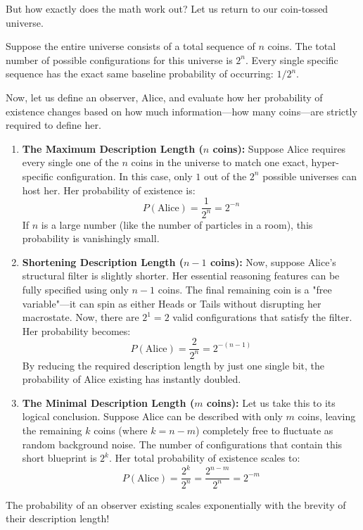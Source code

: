 But how exactly does the math work out? Let us return to our coin-tossed universe.

Suppose the entire universe consists of a total sequence of $n$ coins.
The total number of possible configurations for this universe is $2^n$.
Every single specific sequence has the exact same baseline probability of occurring: $1/2^n$. 

Now, let us define an observer, Alice, and evaluate how her probability of existence changes based on how much information—how many coins—are strictly required to define her.

\begin{enumerate}
    \item \textbf{The Maximum Description Length ($n$ coins):} Suppose Alice requires every single one of the $n$ coins in the universe to match one exact, hyper-specific configuration. In this case, only $1$ out of the $2^n$ possible universes can host her. Her probability of existence is:
    $$P(\text{Alice}) = \frac{1}{2^n} = 2^{-n}$$
    If $n$ is a large number (like the number of particles in a room), this probability is vanishingly small.
    
    \item \textbf{Shortening Description Length ($n-1$ coins):} Now, suppose Alice's structural filter is slightly shorter. Her essential reasoning features can be fully specified using only $n-1$ coins. The final remaining coin is a "free variable"—it can spin as either Heads or Tails without disrupting her macrostate. Now, there are $2^1 = 2$ valid configurations that satisfy the filter. Her probability becomes:
    $$P(\text{Alice}) = \frac{2}{2^n} = 2^{-(n-1)}$$
    By reducing the required description length by just one single bit, the probability of Alice existing has instantly doubled.
    
  \item \textbf{The Minimal Description Length ($m$ coins):} Let us take this to its logical conclusion. Suppose Alice can be described with only $m$ coins, leaving the remaining $k$ coins (where $k = n-m$) completely free to fluctuate as random background noise.
    The number of configurations that contain this short blueprint is $2^k$. Her total probability of existence scales to:
    $$P(\text{Alice}) = \frac{2^k}{2^n} = \frac{2^{n-m}}{2^n} = 2^{-m}$$
\end{enumerate}

The probability of an observer existing scales exponentially with the brevity of their description length!

